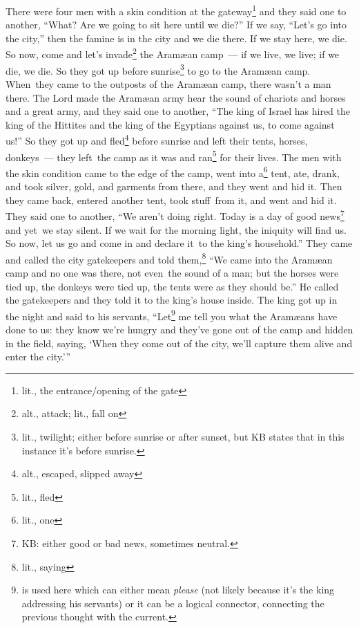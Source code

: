 \begin{inparaenum}
     There were four men with a skin condition at the gateway\footnote{lit., the entrance/opening of the gate} and they said one to another, ``What? Are we going to sit here until we die?''%
     If we say, ``Let's go into the city,'' then the famine is in the city and we die there. If we stay here, we die. So now, come and let's invade\footnote{alt., attack; lit., fall on} the Aram\ae{}an camp~--- if we live, we live; if we die, we die.%
     So they got up before sunrise\footnote{lit., twilight; either before sunrise or after sunset, but KB states that in this instance it's before sunrise.} to go to the Aram\ae{}an camp. When\understood\ they came to the outposts of the Aram\ae{}an camp, there wasn't a man there.%
     The Lord made the Aram\ae{}an army hear the sound of chariots and horses and a great army, and they said one to another, ``The king of Israel has hired the king of the Hittites and the king of the Egyptians against us, to come against us!''%
     So they got up and fled\footnote{alt., escaped, slipped away} before sunrise and left their tents, horses, donkeys~--- they left\understood\ the camp as it was and ran\footnote{lit., fled} for their lives.%
     The men with the skin condition came to the edge of the camp, went into a\footnote{lit., one} tent, ate, drank, and took silver, gold, and garments from there, and they went and hid it. Then they came back, entered another tent, took stuff\understood\ from it, and went and hid it.%
     They said one to another, ``We aren't doing right. Today is a day of good news\footnote{KB: either good or bad news, sometimes neutral.} and yet\understood\ we stay silent. If we wait for the morning light, the iniquity will find us. So now, let us go and come in and declare it\understood\ to the king's household.''%
     They came and called the city gatekeepers and told them,\footnote{lit., saying} ``We came into the Aram\ae{}an camp and no one was there, not even\understood\ the sound of a man; but the horses were tied up, the donkeys were tied up, the tents were as they should be.''\thinspace\understood%
     He called the gatekeepers and they told it to the king's house inside.%
     The king got up in the night and said to his servants, ``Let\footnote{ is used here which can either mean \textit{please} (not likely because it's the king addressing his servants) or it can be a logical connector, connecting the previous thought with the current.} me tell you what the Aram\ae{}ans have done to us: they know we're hungry and they've gone out of the camp and hidden in the field, saying, `When they come out of the city, we'll capture them alive and enter the city.'\thinspace''%
\end{inparaenum}
